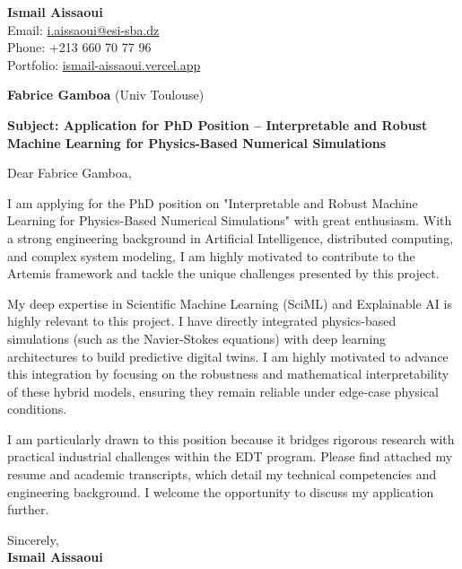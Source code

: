 \documentclass[11pt,a4paper]{article}
\begin{document}
\thispagestyle{empty}

\begin{flushright}
\textbf{Ismail Aissaoui} \\
Email: \href{mailto:i.aissaoui@esi-sba.dz}{i.aissaoui@esi-sba.dz} \\
Phone: +213 660 70 77 96 \\
Portfolio: \href{https://ismail-aissaoui.vercel.app}{ismail-aissaoui.vercel.app}
\end{flushright}

\vspace{1em}

\begin{flushleft}
\textbf{Fabrice Gamboa} (Univ Toulouse)
\end{flushleft}

\vspace{1em}
\noindent\textbf{Subject: Application for PhD Position -- Interpretable and Robust Machine Learning for Physics-Based Numerical Simulations}
\vspace{1em}

\noindent Dear Fabrice Gamboa,

\vspace{1em}
\noindent
I am applying for the PhD position on "Interpretable and Robust Machine Learning for Physics-Based Numerical Simulations" with great enthusiasm. With a strong engineering background in Artificial Intelligence, distributed computing, and complex system modeling, I am highly motivated to contribute to the Artemis framework and tackle the unique challenges presented by this project.

\vspace{0.5em}
\noindent
My deep expertise in Scientific Machine Learning (SciML) and Explainable AI is highly relevant to this project. I have directly integrated physics-based simulations (such as the Navier-Stokes equations) with deep learning architectures to build predictive digital twins. I am highly motivated to advance this integration by focusing on the robustness and mathematical interpretability of these hybrid models, ensuring they remain reliable under edge-case physical conditions.

\vspace{0.5em}
\noindent
I am particularly drawn to this position because it bridges rigorous research with practical industrial challenges within the EDT program. Please find attached my resume and academic transcripts, which detail my technical competencies and engineering background. I welcome the opportunity to discuss my application further.

\vspace{1.5em}
\noindent
Sincerely, \\[0.5em]
\textbf{Ismail Aissaoui}
\end{document}
